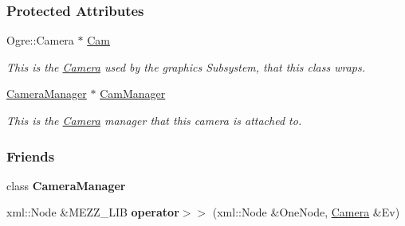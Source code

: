 \subsubsection*{Protected Attributes}
\begin{DoxyCompactItemize}
\item 
\hypertarget{classMezzanine_1_1Camera_a992cc6bb14cd49e4030118dbb4b8e1ed}{
Ogre::Camera $\ast$ \hyperlink{classMezzanine_1_1Camera_a992cc6bb14cd49e4030118dbb4b8e1ed}{Cam}}
\label{classMezzanine_1_1Camera_a992cc6bb14cd49e4030118dbb4b8e1ed}

\begin{DoxyCompactList}\small\item\em This is the \hyperlink{classMezzanine_1_1Camera}{Camera} used by the graphics Subsystem, that this class wraps. \item\end{DoxyCompactList}\item 
\hypertarget{classMezzanine_1_1Camera_a8491540c829acc1bebbed24c9de0dfaf}{
\hyperlink{classMezzanine_1_1CameraManager}{CameraManager} $\ast$ \hyperlink{classMezzanine_1_1Camera_a8491540c829acc1bebbed24c9de0dfaf}{CamManager}}
\label{classMezzanine_1_1Camera_a8491540c829acc1bebbed24c9de0dfaf}

\begin{DoxyCompactList}\small\item\em This is the \hyperlink{classMezzanine_1_1Camera}{Camera} manager that this camera is attached to. \item\end{DoxyCompactList}\end{DoxyCompactItemize}
\subsubsection*{Friends}
\begin{DoxyCompactItemize}
\item 
\hypertarget{classMezzanine_1_1Camera_afae5bf9a900e8c5bc70c9332785e8465}{
class {\bfseries CameraManager}}
\label{classMezzanine_1_1Camera_afae5bf9a900e8c5bc70c9332785e8465}

\item 
\hypertarget{classMezzanine_1_1Camera_a4ff0401fc20f1017ee96470c629dd242}{
xml::Node \&MEZZ\_\-LIB {\bfseries operator$>$$>$} (xml::Node \&OneNode, \hyperlink{classMezzanine_1_1Camera}{Camera} \&Ev)}
\label{classMezzanine_1_1Camera_a4ff0401fc20f1017ee96470c629dd242}

\end{DoxyCompactItemize}


